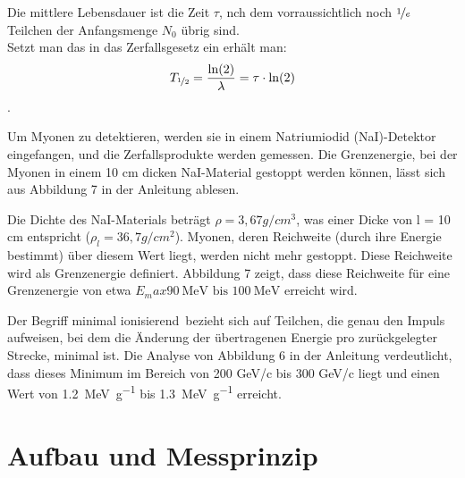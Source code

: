 \documentclass[12pt,a4paper,ngerman]{report}
\begin{document}
		Die mittlere Lebensdauer ist die Zeit $\tau$, nch dem vorraussichtlich noch $\nicefrac{1}{e}$ Teilchen der Anfangsmenge $N_0$ übrig sind. \\
		Setzt man das in das Zerfallsgesetz ein erhält man:
		\[T_{\nicefrac{1}{2}} = \frac{\ln(2)}{\lambda} = \tau \cdot \ln(2) \].
		
		Um Myonen zu detektieren, werden sie in einem Natriumiodid (NaI)-Detektor eingefangen, und die Zerfallsprodukte werden gemessen. Die Grenzenergie, bei der Myonen in einem 10 cm dicken NaI-Material gestoppt werden können, lässt sich aus Abbildung 7 in der Anleitung  \cite{Anleitung} ablesen.
		
		Die Dichte des NaI-Materials beträgt $\rho = 3,67 g/cm^3$, was einer Dicke von l = 10 cm entspricht ($\rho_l = 36,7 g/cm^2$). Myonen, deren Reichweite (durch ihre Energie bestimmt) über diesem Wert liegt, werden nicht mehr gestoppt. Diese Reichweite wird als Grenzenergie definiert. Abbildung 7 zeigt, dass diese Reichweite für eine Grenzenergie von etwa $E_max  \qty{90}{\mega\electronvolt} \text{ bis } \qty{100}{\mega\electronvolt}$ erreicht wird.
		
		Der Begriff \glqq minimal ionisierend\grqq ~bezieht sich auf Teilchen, die genau den Impuls aufweisen, bei dem die Änderung der übertragenen Energie pro zurückgelegter Strecke, minimal ist. Die Analyse von Abbildung 6 in der Anleitung verdeutlicht, dass dieses Minimum im Bereich von 200 GeV/c bis 300 GeV/c liegt und einen Wert von \qty{1,2}{\mega \electronvolt\per\gram} bis \qty{1,3}{\mega \electronvolt\per\gram} erreicht.
		

\chapter{Aufbau und Messprinzip}
\end{document}
